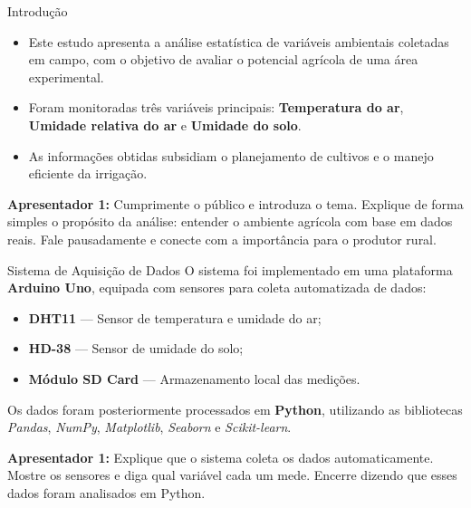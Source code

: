\documentclass{beamer}
\begin{document}
\begin{frame}{Introdução}
\begin{itemize}
    \item Este estudo apresenta a análise estatística de variáveis ambientais coletadas em campo, com o objetivo de avaliar o potencial agrícola de uma área experimental.
    \item Foram monitoradas três variáveis principais: \textbf{Temperatura do ar}, \textbf{Umidade relativa do ar} e \textbf{Umidade do solo}.
    \item As informações obtidas subsidiam o planejamento de cultivos e o manejo eficiente da irrigação.
\end{itemize}

\begin{tcolorbox}[roteiro]
\textbf{Apresentador 1:}  
Cumprimente o público e introduza o tema.  
Explique de forma simples o propósito da análise: entender o ambiente agrícola com base em dados reais.  
Fale pausadamente e conecte com a importância para o produtor rural.
\end{tcolorbox}
\end{frame}

\begin{frame}{Sistema de Aquisição de Dados}
O sistema foi implementado em uma plataforma \textbf{Arduino Uno}, equipada com sensores para coleta automatizada de dados:
\begin{itemize}
    \item \textbf{DHT11} — Sensor de temperatura e umidade do ar;
    \item \textbf{HD-38} — Sensor de umidade do solo;
    \item \textbf{Módulo SD Card} — Armazenamento local das medições.
\end{itemize}

Os dados foram posteriormente processados em \textbf{Python}, utilizando as bibliotecas \textit{Pandas}, \textit{NumPy}, \textit{Matplotlib}, \textit{Seaborn} e \textit{Scikit-learn}.

\begin{tcolorbox}[roteiro]
\textbf{Apresentador 1:}  
Explique que o sistema coleta os dados automaticamente.  
Mostre os sensores e diga qual variável cada um mede.  
Encerre dizendo que esses dados foram analisados em Python.
\end{tcolorbox}
\end{frame}
\end{document}
